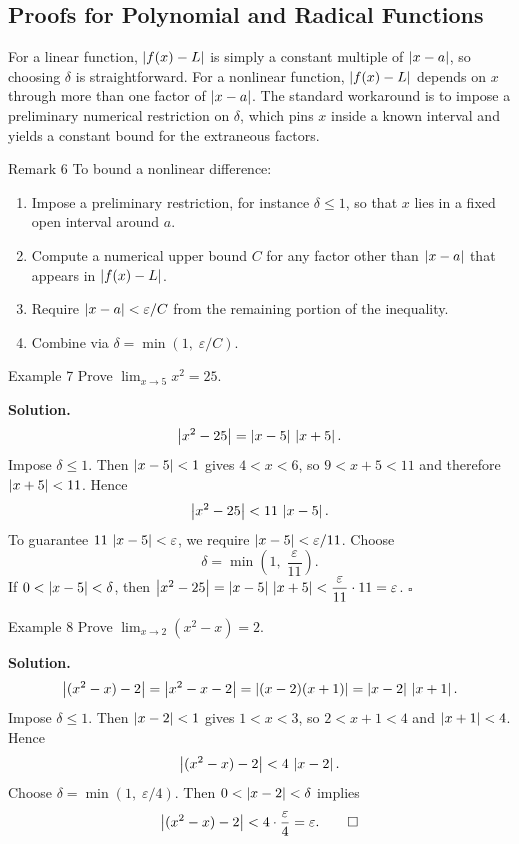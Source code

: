 \subsection*{Proofs for Polynomial and Radical Functions}
\label{subsec:1.4.3}

For a linear function, \(\left|f(x)-L\right|\) is simply a constant multiple of \(\left|x-a\right|\), so choosing \(\delta\) is straightforward. For a nonlinear function, \(\left|f(x)-L\right|\) depends on \(x\) through more than one factor of \(\left|x-a\right|\). The standard workaround is to impose a preliminary numerical restriction on \(\delta\), which pins \(x\) inside a known interval and yields a constant bound for the extraneous factors.

\begin{remarkbox}{Remark 6}
To bound a nonlinear difference:
\begin{enumerate}
    \item Impose a preliminary restriction, for instance \(\delta \le 1\), so that \(x\) lies in a fixed open interval around \(a\).
    \item Compute a numerical upper bound \(C\) for any factor other than \(\left|x-a\right|\) that appears in \(\left|f(x)-L\right|\).
    \item Require \(\left|x-a\right| < \varepsilon / C\) from the remaining portion of the inequality.
    \item Combine via \(\delta = \min(1,\; \varepsilon/C)\).
\end{enumerate}
\end{remarkbox}

\begin{examplebox}{Example 7}
Prove \(\displaystyle\lim_{x \to 5} x^{2} = 25\).

\medskip
\textbf{Solution.}
\[
\left|x^{2} - 25\right| = \left|x - 5\right|\,\left|x + 5\right|.
\]
Impose \(\delta \le 1\). Then \(\left|x - 5\right| < 1\) gives \(4 < x < 6\), so \(9 < x + 5 < 11\) and therefore \(\left|x + 5\right| < 11\). Hence
\[
\left|x^{2} - 25\right| < 11\,\left|x - 5\right|.
\]
To guarantee \(11\,\left|x - 5\right| < \varepsilon\), we require \(\left|x - 5\right| < \varepsilon/11\). Choose
\[
\delta = \min\!\left(1,\; \frac{\varepsilon}{11}\right).
\]
If \(0 < \left|x - 5\right| < \delta\), then \(\left|x^{2} - 25\right| = \left|x - 5\right|\,\left|x + 5\right| < \dfrac{\varepsilon}{11}\cdot 11 = \varepsilon\). \(\square\)
\end{examplebox}

\begin{examplebox}{Example 8}
Prove \(\displaystyle\lim_{x \to 2} (x^{2} - x) = 2\).

\medskip
\textbf{Solution.}
\[
\left|(x^{2} - x) - 2\right| = \left|x^{2} - x - 2\right| = \left|(x - 2)(x + 1)\right| = \left|x - 2\right|\,\left|x + 1\right|.
\]
Impose \(\delta \le 1\). Then \(\left|x - 2\right| < 1\) gives \(1 < x < 3\), so \(2 < x + 1 < 4\) and \(\left|x + 1\right| < 4\). Hence
\[
\left|(x^{2} - x) - 2\right| < 4\,\left|x - 2\right|.
\]
Choose \(\delta = \min(1,\; \varepsilon/4)\). Then \(0 < \left|x - 2\right| < \delta\) implies
\[
\left|(x^{2} - x) - 2\right| < 4\cdot\frac{\varepsilon}{4} = \varepsilon.\qquad\square
\]
\end{examplebox}


